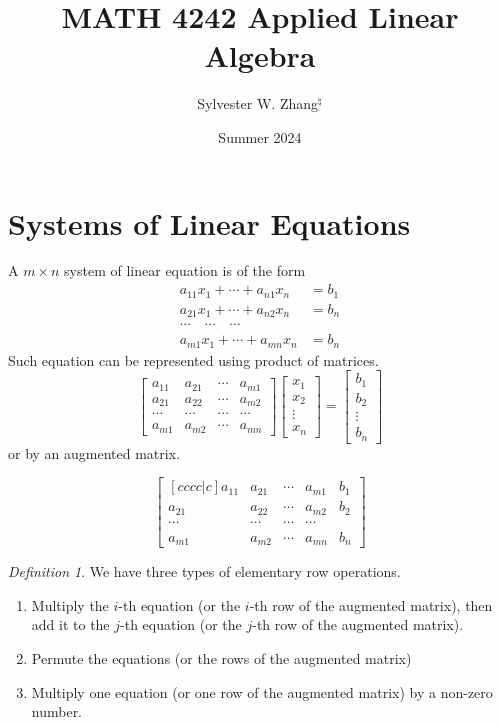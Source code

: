 \documentclass[12pt]{amsart}
\title{MATH 4242 Applied Linear Algebra}
\author[S. Zhang]{Sylvester W. Zhang$^\natural$}
\date{Summer 2024}
\theoremstyle{remark}
\newtheorem{definition}[theorem]{Definition}
\numberwithin{equation}{section}
\begin{document}
\maketitle	

\tableofcontents

\section{Systems of Linear Equations}
A $m\times n$ system of linear equation is of the form
\begin{align*}
	a_{11}x_1+\cdots +a_{n1}x_n&=b_1\\
	a_{21}x_1+\cdots +a_{n2}x_n&=b_n\\
	\cdots\quad \cdots \quad\cdots&\\
	a_{m1}x_1+\cdots+a_{mn}x_n&=b_n
\end{align*}
Such equation can be represented using product of matrices.
\[\begin{bmatrix}
	a_{11}&a_{21}&\cdots &a_{m1}\\
	a_{21}&a_{22}&\cdots &a_{m2}\\
	\cdots&\cdots&\cdots &\cdots\\
	a_{m1}&a_{m2}&\cdots &a_{mn}
\end{bmatrix} \begin{bmatrix}
	x_1\\x_2\\\vdots\\x_n
\end{bmatrix} = \begin{bmatrix} b_1\\b_2\\ \vdots \\b_n \end{bmatrix}\]
or by an augmented matrix.

\[\begin{bmatrix}[cccc|c]
	a_{11}&a_{21}&\cdots &a_{m1}&b_1\\
	a_{21}&a_{22}&\cdots &a_{m2}&b_2\\
	\cdots&\cdots&\cdots &\cdots&\\
	a_{m1}&a_{m2}&\cdots &a_{mn}&b_n
\end{bmatrix} \]
\begin{definition}
	We have three types of elementary row operations.
	\begin{enumerate}
		\item Multiply the $i$-th equation (or the $i$-th row of the augmented matrix), then add it to the $j$-th equation (or the $j$-th row of the augmented matrix).
		\item Permute the equations (or the rows of the augmented matrix)
		\item Multiply one equation (or one row of the augmented matrix) by a non-zero number.
	\end{enumerate}
\end{definition}
\end{document}
